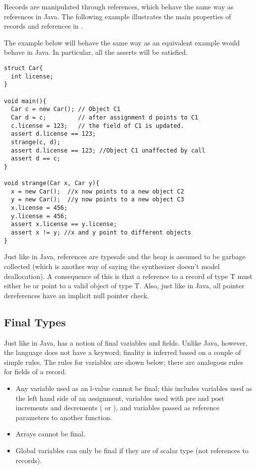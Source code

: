 Records are manipulated through references, which behave the same way as references in Java. The following example illustrates the main properties of records and references in \Sk{}.

\begin{Example}
The example below will behave the same way as an equivalent example would behave in Java. In particular, all the asserts will be satisfied.
\begin{lstlisting}
struct Car{
  int license;
}

void main(){
  Car c = new Car(); // Object C1
  Car d = c;         // after assignment d points to C1
  c.license = 123;   // the field of C1 is updated.
  assert d.license == 123;
  strange(c, d);
  assert d.license == 123; //Object C1 unaffected by call
  assert d == c;
}

void strange(Car x, Car y){
  x = new Car();  //x now points to a new object C2
  y = new Car();  //y now points to a new object C3
  x.license = 456;
  y.license = 456;
  assert x.license == y.license;
  assert x != y; //x and y point to different objects
}
\end{lstlisting}

\end{Example}

Just like in Java, references are typesafe and the heap is assumed to be garbage collected (which is another way of saying the synthesizer doesn't model deallocation). A consequence of this is that a reference to a record of type T must either be  or point to a valid object of type T. Also, just like in Java, all pointer dereferences have an implicit null pointer check.

\subsection{Final Types}
Just like in Java, \Sk{} has a notion of final variables and fields. Unlike Java, however, the language does not have a  keyword; finality is inferred based on a couple of simple rules. The rules for variables are shown below; there are analogous rules for fields of a record. 

\begin{itemize}
\item Any variable used as an l-value cannot be final; this includes variables used as the left hand side of an assignment, variables used with pre and post increments and decrements ( or ), and variables passed as reference parameters to another function.
\item Arrays cannot be final. 
\item Global variables can only be final if they are of scalar type (not references to records).
\end{itemize}

